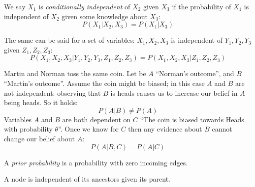 \documentclass[12pt, a4paper]{report}
\begin{document}
    \begin{definition}
        We say $X_1$ is \emph{conditionally independent} of $X_2$ given $X_3$ if the probability of $X_1$ is independent of $X_2$ given some
        knowledge about $X_3$:
        \[P(X_1|X_2,X_3)=P(X_1|X_3)\]
    \end{definition}
    The same can be said for a set of variables: $X_1,X_2,X_3$ is independent of $Y_1,Y_2,Y_3$ given $Z_1,Z_2,Z_3$:
    \[P(X_1,X_2,X_3|Y_1,Y_2,Y_3,Z_1,Z_2,Z_3)=P(X_1,X_2,X_3|Z_1,Z_2,Z_3)\]
    \begin{example}
        Martin and Norman toss the same coin. Let be $A$ “Norman's outcome”, and $B$ “Martin's outcome”. Assume the coin might be biased; 
        in this case $A$ and $B$ are not independent: observing that $B$ is heads causes us to increase our belief in $A$ being heads. So
        it holds: 
        \[P(A|B) \neq P(A)\]
        Variables $A$ and $B$ are both dependent on $C$ “The coin is biased towards Heads with probability $\theta$”. Once we know for 
        $C$ then any evidence about $B$ cannot change our belief about $A$:
        \[P(A|B,C)=P(A|C)\]
    \end{example}
    \begin{definition}
        A \emph{prior probability} is a probability with zero incoming edges. 
    \end{definition}
    A node is independent of its ancestors given its parent. 
\end{document}
